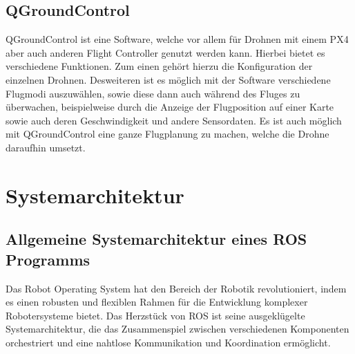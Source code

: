 \subsection{QGroundControl}  \label{qGroundControl:subsection}
QGroundControl ist eine Software, welche vor allem für Drohnen mit einem PX4 aber auch anderen Flight Controller genutzt werden kann. Hierbei bietet es verschiedene Funktionen. Zum einen gehört hierzu die Konfiguration der einzelnen  Drohnen. Desweiteren ist es möglich mit der Software verschiedene Flugmodi auszuwählen, sowie diese dann auch während des Fluges zu überwachen, beispielweise durch die Anzeige der Flugposition auf einer Karte sowie auch deren Geschwindigkeit und andere Sensordaten.
Es ist auch möglich mit QGroundControl eine ganze Flugplanung zu machen, welche die Drohne daraufhin umsetzt. \cite[vgl.][]{qGroundControl}


\section{Systemarchitektur}

\subsection{Allgemeine Systemarchitektur eines ROS Programms}
Das Robot Operating System hat den Bereich der Robotik revolutioniert, indem es einen robusten und flexiblen Rahmen für die Entwicklung komplexer Robotersysteme bietet. Das Herzstück von \ac{ROS} ist seine ausgeklügelte Systemarchitektur, die das Zusammenspiel zwischen verschiedenen Komponenten orchestriert und eine nahtlose Kommunikation und Koordination ermöglicht.

